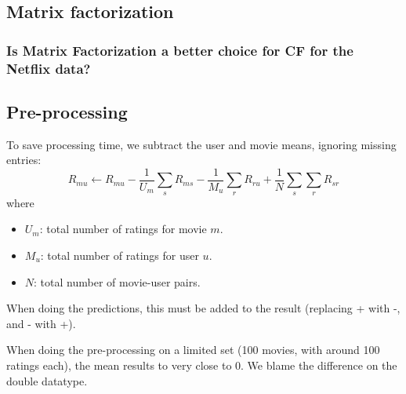 \subsection{Matrix factorization}


\subsubsection{Is Matrix Factorization a better choice for CF for the Netflix data?}


\subsection{Pre-processing}
To save processing time, we subtract the user and movie means, ignoring missing entries:
\[
    R_{mu} \gets R_{mu} - \frac{1}{U_m}\sum_{s}{R_{ms}} - \frac{1}{M_u}\sum_{r}{R_{ru}} + \frac{1}{N}\sum_{s}\sum_{r}{R_{sr}}
\]
where
\begin{itemize}
    \item $U_m$: total number of ratings for movie $m$.
    \item $M_u$: total number of ratings for user $u$.
    \item $N$: total number of movie-user pairs.
\end{itemize}
%
When doing the predictions, this must be added to the result (replacing + with -, and - with +).

When doing the pre-processing on a limited set (100 movies, with around 100 ratings each), the mean results to very close to 0. We blame the difference on the double datatype.